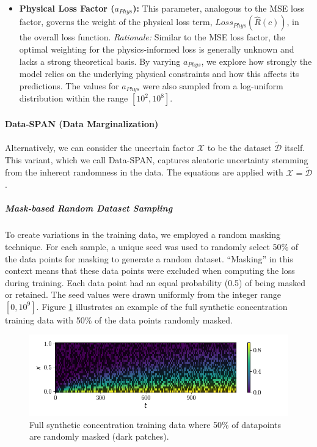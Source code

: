 \begin{itemize}
    \item \textbf{Physical Loss Factor ($a_{Phys}$):}  This parameter, analogous to the MSE loss factor, governs the weight of the physical loss term, $Loss_{Phys}(\hat{R}(c))$, in the overall loss function. \textit{Rationale:} Similar to the MSE loss factor, the optimal weighting for the physics-informed loss is generally unknown and lacks a strong theoretical basis. By varying $a_{Phys}$, we explore how strongly the model relies on the underlying physical constraints and how this affects its predictions. The values for $a_{Phys}$ were also sampled from a log-uniform distribution within the range $[10^2, 10^8]$.
\end{itemize}



\paragraph{Data-SPAN (Data Marginalization)}

Alternatively, we can consider the uncertain factor $\mathcal{X}$ to be the dataset $\tilde{\mathcal{D}}$ itself. This variant, which we call Data-SPAN, captures aleatoric uncertainty stemming from the inherent randomness in the data. The equations are applied with $\mathcal{X} = \tilde{\mathcal{D}}$.


\subparagraph{Mask-based Random Dataset Sampling}

To create variations in the training data, we employed a random masking technique. For each sample, a unique seed was used to randomly select 50\% of the data points for masking to generate a random dataset. ``Masking'' in this context means that these data points were excluded when computing the loss during training. Each data point had an equal probability (0.5) of being masked or retained. The seed values were drawn uniformly from the integer range $[0, 10^9]$. Figure \ref{fig:training_data_mask} illustrates an example of the full synthetic concentration training data with 50\% of the data points randomly masked.

\begin{figure}[h]
    \centering
    \includegraphics{figs/c_diss_field_train_random_subset.png}
    \caption{Full synthetic concentration training data where 50\% of datapoints are randomly masked (dark patches).}
    \label{fig:training_data_mask}
\end{figure}


